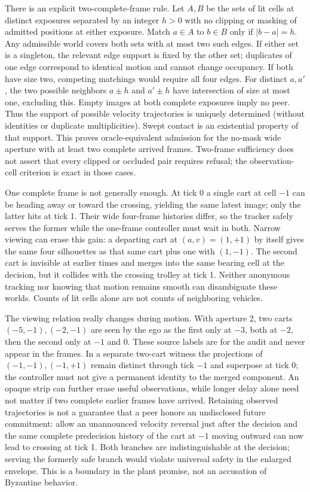 \documentclass[11pt]{article}
\begin{document}
There is an explicit two-complete-frame rule. Let $A,B$ be the sets of lit cells at distinct exposures separated by an integer $h>0$ with no clipping or masking of admitted positions at either exposure. Match $a\in A$ to $b\in B$ only if $|b-a|=h$. Any admissible world covers both sets with at most two such edges. If either set is a singleton, the relevant edge support is fixed by the other set; duplicates of one edge correspond to identical motion and cannot change occupancy. If both have size two, competing matchings would require all four edges. For distinct $a,a'$, the two possible neighbors $a\pm h$ and $a'\pm h$ have intersection of size at most one, excluding this. Empty images at both complete exposures imply no peer. Thus the support of possible velocity trajectories is uniquely determined (without identities or duplicate multiplicities). Swept contact is an existential property of that support. This proves oracle-equivalent admission for the no-mask wide aperture with at least two complete arrived frames. Two-frame sufficiency does not assert that every clipped or occluded pair requires refusal; the observation-cell criterion is exact in those cases.

One complete frame is not generally enough. At tick 0 a single cart at cell $-1$ can be heading away or toward the crossing, yielding the same latest image; only the latter hits at tick 1. Their wide four-frame histories differ, so the tracker safely serves the former while the one-frame controller must wait in both. Narrow viewing can erase this gain: a departing cart at $(a,v)=(1,+1)$ by itself gives the same four silhouettes as that same cart plus one with $(1,-1)$. The second cart is invisible at earlier times and merges into the same bearing cell at the decision, but it collides with the crossing trolley at tick 1. Neither anonymous tracking nor knowing that motion remains smooth can disambiguate these worlds. Counts of lit cells alone are not counts of neighboring vehicles.

The viewing relation really changes during motion. With aperture 2, two carts $(-5,-1),(-2,-1)$ are seen by the ego as the first only at $-3$, both at $-2$, then the second only at $-1$ and 0. These source labels are for the audit and never appear in the frames. In a separate two-cart witness the projections of $(-1,-1),(-1,+1)$ remain distinct through tick $-1$ and superpose at tick 0; the controller must not give a permanent identity to the merged component. An opaque strip can further erase useful observations, while longer delay alone need not matter if two complete earlier frames have arrived. Retaining observed trajectories is not a guarantee that a peer honors an undisclosed future commitment: allow an unannounced velocity reversal just after the decision and the same complete predecision history of the cart at $-1$ moving outward can now lead to crossing at tick 1. Both branches are indistinguishable at the decision; serving the formerly safe branch would violate universal safety in the enlarged envelope. This is a boundary in the plant promise, not an accusation of Byzantine behavior.
\end{document}
